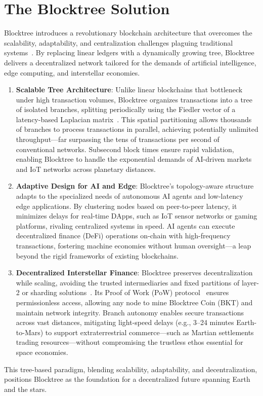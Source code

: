 \section{The Blocktree Solution}
Blocktree introduces a revolutionary blockchain architecture that overcomes the scalability, adaptability, and centralization challenges plaguing traditional systems~\cite{nakamoto2008bitcoin, buterin2014ethereum}. By replacing linear ledgers with a dynamically growing tree, Blocktree delivers a decentralized network tailored for the demands of artificial intelligence, edge computing, and interstellar economies.

\begin{enumerate}
    \item \textbf{Scalable Tree Architecture}: Unlike linear blockchains that bottleneck under high transaction volumes, Blocktree organizes transactions into a tree of isolated branches, splitting periodically using the Fiedler vector of a latency-based Laplacian matrix~\cite{ng2001spectral}. This spatial partitioning allows thousands of branches to process transactions in parallel, achieving potentially unlimited throughput—far surpassing the tens of transactions per second of conventional networks. Subsecond block times ensure rapid validation, enabling Blocktree to handle the exponential demands of AI-driven markets and IoT networks across planetary distances.

    \item \textbf{Adaptive Design for AI and Edge}: Blocktree’s topology-aware structure adapts to the specialized needs of autonomous AI agents and low-latency edge applications. By clustering nodes based on peer-to-peer latency, it minimizes delays for real-time DApps, such as IoT sensor networks or gaming platforms, rivaling centralized systems in speed. AI agents can execute decentralized finance (DeFi) operations on-chain with high-frequency transactions, fostering machine economies without human oversight—a leap beyond the rigid frameworks of existing blockchains.

    \item \textbf{Decentralized Interstellar Finance}: Blocktree preserves decentralization while scaling, avoiding the trusted intermediaries and fixed partitions of layer-2 or sharding solutions~\cite{wang2019sharding}. Its Proof of Work (PoW) protocol~\cite{nakamoto2008bitcoin} ensures permissionless access, allowing any node to mine Blocktree Coin (BKT) and maintain network integrity. Branch autonomy enables secure transactions across vast distances, mitigating light-speed delays (e.g., 3–24 minutes Earth-to-Mars) to support extraterrestrial commerce—such as Martian settlements trading resources—without compromising the trustless ethos essential for space economies.
\end{enumerate}

This tree-based paradigm, blending scalability, adaptability, and decentralization, positions Blocktree as the foundation for a decentralized future spanning Earth and the stars.
